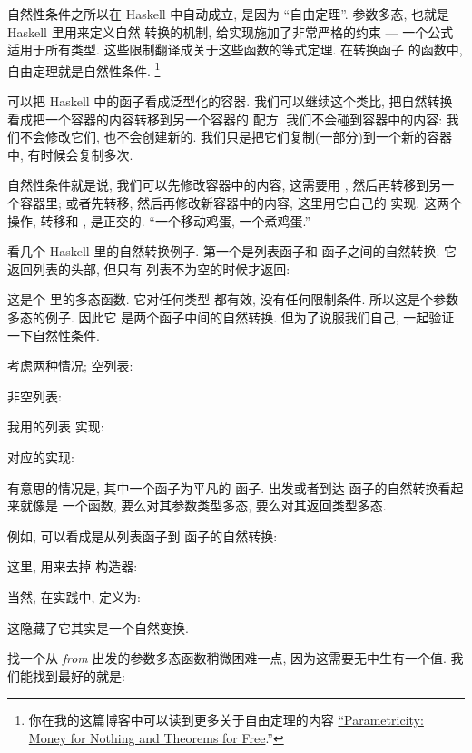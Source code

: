 自然性条件之所以在 Haskell 中自动成立, 是因为 ``自由定理''. 参数多态, 也就是 Haskell 里用来定义自然
转换的机制, 给实现施加了非常严格的约束 --- 一个公式适用于所有类型. 这些限制翻译成关于这些函数的等式定理. 在转换函子
的函数中, 自由定理就是自然性条件. \footnote{
  你在我的这篇博客中可以读到更多关于自由定理的内容 \href{https://bartoszmilewski.com/2014/09/22/parametricity-money-for-nothing-and-theorems-for-free/}{``Parametricity:
    Money for Nothing and Theorems for Free}.''}

可以把 Haskell 中的函子看成泛型化的容器. 我们可以继续这个类比, 把自然转换看成把一个容器的内容转移到另一个容器的
配方. 我们不会碰到容器中的内容: 我们不会修改它们, 也不会创建新的. 我们只是把它们复制(一部分)到一个新的容器中,
有时候会复制多次.

自然性条件就是说, 我们可以先修改容器中的内容, 这需要用 , 然后再转移到另一个容器里; 或者先转移,
然后再修改新容器中的内容, 这里用它自己的  实现. 这两个操作, 转移和 , 是正交的.
``一个移动鸡蛋, 一个煮鸡蛋.''

看几个 Haskell 里的自然转换例子. 第一个是列表函子和  函子之间的自然转换. 它返回列表的头部, 但只有
列表不为空的时候才返回:

这是个  里的多态函数. 它对任何类型  都有效, 没有任何限制条件. 所以这是个参数多态的例子. 因此它
是两个函子中间的自然转换. 但为了说服我们自己, 一起验证一下自然性条件.

考虑两种情况; 空列表:


非空列表:


我用的列表  实现:

 对应的实现:

有意思的情况是, 其中一个函子为平凡的  函子. 出发或者到达  函子的自然转换看起来就像是
一个函数, 要么对其参数类型多态, 要么对其返回类型多态.

例如,  可以看成是从列表函子到  函子的自然转换:

这里,  用来去掉  构造器:

当然, 在实践中,  定义为:

这隐藏了它其实是一个自然变换.

找一个从  \emph{from} 出发的参数多态函数稍微困难一点, 因为这需要无中生有一个值. 我们能找到最好的就是:

